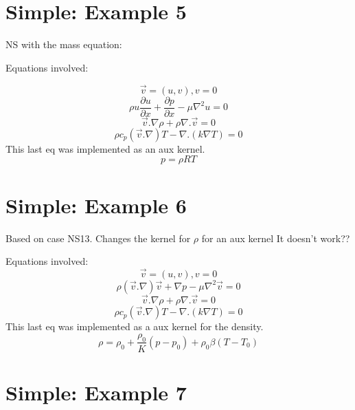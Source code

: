 \documentclass[11pt,letterpaper]{article}
\begin{document}
\section{Simple: Example 5}

NS with the mass equation:

Equations involved:

\begin{equation}
\vec{v}=(u,v), v = 0
\end{equation}
\begin{equation}
\rho u\frac{\partial u}{\partial x} + \frac{\partial p}{\partial x} - \mu \nabla^{2}u = 0
\end{equation}
\begin{equation}
\vec{v}.\nabla \rho + \rho \nabla.\vec{v}=0
\end{equation}
\begin{equation}
\rho c_{p} (\vec{v}.\nabla)T - \nabla .(k\nabla T) = 0
\end{equation}
This last eq was implemented as an aux kernel.
\begin{equation}
p = \rho R T
\end{equation}

\section{Simple: Example 6}

Based on case NS13. Changes the kernel for $\rho$ for an aux kernel
It doesn't work??

Equations involved:
\begin{equation}
\vec{v}=(u,v), v = 0
\end{equation}
\begin{equation}
\rho (\vec{v}.\nabla)\vec{v} + \nabla p - \mu \nabla^{2}\vec{v} = 0
\end{equation}
\begin{equation}
\vec{v}.\nabla \rho + \rho \nabla.\vec{v}=0
\end{equation}
\begin{equation}
\rho c_{p} (\vec{v}.\nabla)T - \nabla .(k\nabla T) = 0
\end{equation}
This last eq was implemented as a aux kernel for the density.
\begin{equation}
\rho = \rho_{0} + \frac{\rho_{0}}{K}(p-p_{0}) + \rho_{0}\beta(T-T_{0})
\end{equation}

\section{Simple: Example 7}
\end{document}
